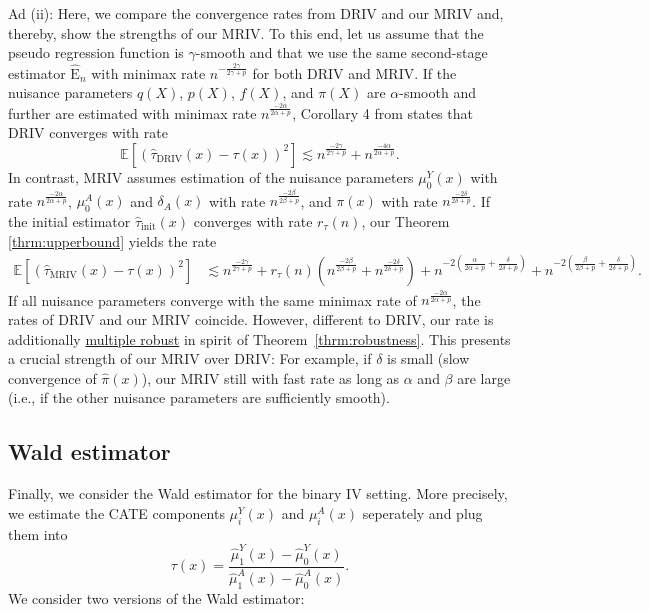 \documentclass{article} %
\newcommand{\E}{\mathbb{E}}
\newcommand{\frameworkname}{MRIV\xspace}
\theoremstyle{definition}
\theoremstyle{plain}
\begin{document}
Ad (ii): Here, we compare the convergence rates from DRIV and our \frameworkname and, thereby, show the strengths of our \frameworkname. To this end, let us assume that the pseudo regression function is $\gamma$-smooth and that we use the same second-stage estimator $\hat{\mathrm{E}}_n$ with minimax rate $n^{-\frac{2\gamma}{2\gamma + p}}$ for both DRIV and \frameworkname. If the nuisance parameters $q(X)$, $p(X)$, $f(X)$, and $\pi(X)$ are $\alpha$-smooth and further are estimated with minimax rate $n^{\frac{-2\alpha}{2\alpha+p}}$, Corollary 4 from \citep{Syrgkanis.2019} states that DRIV converges with rate 
\begin{equation*}
   \E\left[\left(\hat{\tau}_{\mathrm{DRIV}}(x) - \tau(x)\right)^2\right]  \lesssim  n^{\frac{-2\gamma}{2\gamma+p}} + n^{\frac{-4\alpha}{2\alpha+p}}.
\end{equation*}
In contrast, \frameworkname assumes estimation of the nuisance parameters $\mu_0^Y(x)$ with rate $n^{\frac{-2\alpha}{2\alpha+p}}$, $\mu_0^A(x)$ and $\delta_A(x)$ with rate $n^{\frac{-2\beta}{2\beta+p}}$, and $\pi(x)$ with rate $n^{\frac{-2\delta}{2\delta+p}}$. If the initial estimator $\hat{\tau}_{\mathrm{init}}(x)$ converges with rate $r_{\tau}(n)$, our Theorem \ref{thrm:upperbound} yields the rate
\begin{equation*}
\begin{split}
    \E\left[\left(\hat{\tau}_{\mathrm{MRIV}}(x) - \tau(x)\right)^2\right] & \lesssim   n^{\frac{-2\gamma}{2\gamma+p}} + r_{\tau}(n) \left(n^{\frac{-2\beta}{2\beta+p}} + n^{\frac{-2\delta}{2\delta+p}}  \right) + 
    n^{-2\left(\frac{\alpha}{2\alpha+p}+\frac{\delta}{2\delta+p}\right)} +
    n^{-2\left(\frac{\beta}{2\beta+p}+\frac{\delta}{2\delta+p}\right)} .
\end{split}
\end{equation*}
If all nuisance parameters converge with the same minimax rate of $n^{\frac{-2\alpha}{2\alpha+p}}$, the rates of DRIV and our \frameworkname coincide. However, different to DRIV, our rate is additionally \underline{multiple robust} in spirit of Theorem~\ref{thrm:robustness}. This presents a crucial strength of our \frameworkname over DRIV: For example, if $\delta$ is small (slow convergence of $\hat{\pi}(x)$), our \frameworkname still with fast rate as long as $\alpha$ and $\beta$ are large (i.e., if the other nuisance parameters are sufficiently smooth).

\subsection{Wald estimator}
Finally, we consider the Wald estimator \citep{Wald.1940} for the binary IV setting. More precisely, we estimate the CATE components $\mu_i^Y(x)$ and $\mu_i^A(x)$ seperately and plug them into
\begin{equation}
    \tau(x) = \frac{\hat{\mu}_1^Y(x) - \hat{\mu}_0^Y(x)}{\hat{\mu}_1^A(x) - \hat{\mu}_0^A(x)}.
\end{equation}
We consider two versions of the Wald estimator:
\end{document}
